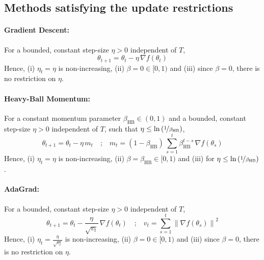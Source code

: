 \documentclass{article}
\newcommand{\normsq}[1]{\left\|#1 \right\|^{2}}
\newcommand{\tht}{\theta_t}
\newcommand{\thtt}{\theta_{t+1}}
\begin{document}
\subsection{Methods satisfying the update restrictions}
\label{app:lb-examples}

\paragraph{Gradient Descent:} For a bounded, constant step-size $\eta > 0$ independent of $T$, 
\[
\thtt = \tht - \eta \, \nabla f(\tht)
\]
Hence, (i) $\eta_t = \eta$ is non-increasing, (ii) $\beta = 0 \in [0,1)$ and (iii) since $\beta = 0$, there is no restriction on $\eta$. 
 

\paragraph{Heavy-Ball Momentum:} For a constant momentum parameter $\beta_{\text{HB}} \in (0,1)$ and a bounded, constant step-size $\eta > 0$ independent of $T$, such that $\eta \leq \ln\left(\nicefrac{1}{\beta_{\text{HB}}} \right)$, 
\[
\thtt = \tht - \eta \, m_t \quad \text{;} \quad m_t = (1 - \beta_{\text{HB}} ) \, \sum_{s = 1}^{t} \beta_{\text{HB}}^{t-s} \, \nabla f(\theta_s)
\]
Hence, (i) $\eta_t = \eta$ is non-increasing, (ii) $\beta =  \beta_{\text{HB}} \in [0,1)$ and (iii) for $\eta \leq \ln\left(\nicefrac{1}{\beta_{\text{HB}}} \right)$. 

\paragraph{AdaGrad:} For a bounded, constant step-size $\eta > 0$ independent of $T$, 
\[
\thtt = \tht - \frac{\eta}{\sqrt{v_t}} \, \nabla f(\tht) \quad \text{;} \quad v_t = \sum_{s=1}^t \normsq{\nabla f(\theta_s)}
\]
Hence, (i) $\eta_t = \frac{\eta}{\sqrt{v_t}}$ is non-increasing, (ii) $\beta = 0 \in [0,1)$ and (iii) since $\beta = 0$, there is no restriction on $\eta$. 
\end{document}
